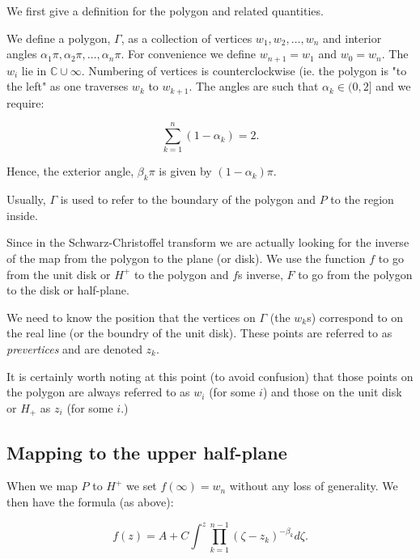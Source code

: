 \documentclass[a4paper,10pt]{amsart}
\newcommand{\sch}{Schwarz-Christoffel }
\begin{document}
We first give a definition for the polygon and related quantities.

\begin{defn}[Polygon]
We define a polygon, $\Gamma$, as a collection of vertices $w_1, w_2,\dots,w_n$ and interior angles $\alpha_1\pi, \alpha_2\pi, \dots, \alpha_n\pi$. For convenience we define $w_{n+1} = w_1$ and $w_0=w_n$. The $w_i$ lie in $\mathbb{C} \cup {\infty}$. Numbering of vertices is counterclockwise (ie. the polygon is "to the left" as one traverses $w_k$ to $w_{k+1}$. The angles are such that $\alpha_k \in (0,2]$ and we require:

\begin{equation}
\sum_{k=1}^n (1-\alpha_k) = 2.
\end{equation}

Hence, the exterior angle, $\beta_k\pi$ is given by $(1-\alpha_k)\pi$.

Usually, $\Gamma$ is used to refer to the boundary of the polygon and $P$ to the region inside.

\end{defn}

Since in the \sch transform we are actually looking for the inverse of the map from the polygon to the plane (or disk). We use the function $f$ to go from the unit disk or $H^+$ to the polygon and $f$s inverse, $F$ to go from the polygon to the disk or half-plane.  

We need to know the position that the vertices on $\Gamma$ (the $w_k$s) correspond to on the real line (or the boundry of the unit disk). These points are referred to as \emph{prevertices} and are denoted $z_k$.

It is certainly worth noting at this point (to avoid confusion) that those points on the polygon are always referred to as $w_i$ (for some $i$) and those on the unit disk or $H_+$ as $z_i$ (for some $i$.)




\subsection{Mapping to the upper half-plane}

When we map $P$ to $H^+$ we set $f(\infty) = w_n$ without any loss of generality. We then have the formula (as above):

\begin{equation}
f(z) = A + C \int^z \prod_{k=1}^{n-1} (\zeta-z_k)^{-\beta_k} d\zeta.
\end{equation}
\end{document}
